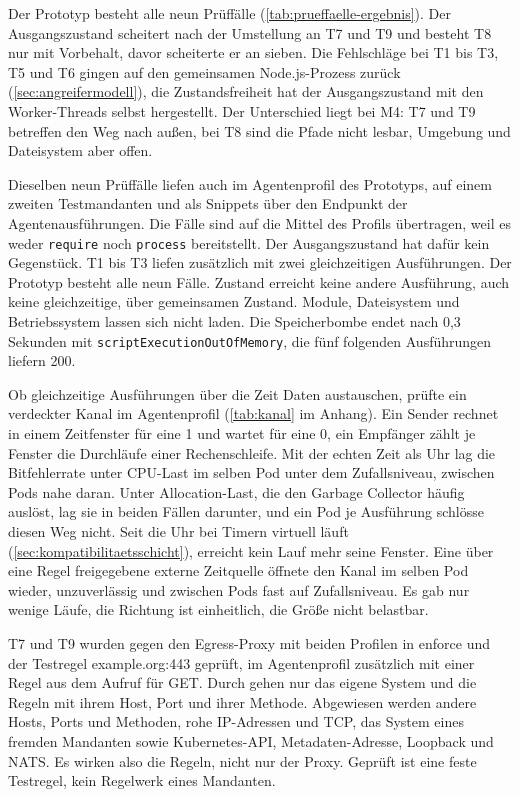 Der Prototyp besteht alle neun Prüffälle (\autoref{tab:prueffaelle-ergebnis}). Der Ausgangszustand scheitert nach der
Umstellung an T7 und T9 und besteht T8 nur mit Vorbehalt, davor scheiterte er an sieben. Die Fehlschläge bei T1 bis T3,
T5 und T6 gingen auf den gemeinsamen Node.js-Prozess zurück (\autoref{sec:angreifermodell}), die Zustandsfreiheit hat
der Ausgangszustand mit den Worker-Threads selbst hergestellt. Der Unterschied liegt bei M4: T7 und T9 betreffen den Weg
nach außen, bei T8 sind die Pfade nicht lesbar, Umgebung und Dateisystem aber offen.

Dieselben neun Prüffälle liefen auch im Agentenprofil des Prototyps, auf einem zweiten Testmandanten
und als Snippets über den Endpunkt der Agentenausführungen. Die Fälle sind auf die Mittel des
Profils übertragen, weil es weder \texttt{require} noch \texttt{process} bereitstellt. Der Ausgangszustand hat dafür kein Gegenstück. T1 bis T3 liefen
zusätzlich mit zwei gleichzeitigen Ausführungen. Der Prototyp besteht alle neun Fälle. Zustand erreicht keine andere Ausführung, auch
keine gleichzeitige, über gemeinsamen Zustand. Module, Dateisystem und Betriebssystem lassen sich nicht laden. Die Speicherbombe endet nach 0,3 Sekunden mit
\texttt{scriptExecutionOutOfMemory}, die fünf folgenden Ausführungen liefern 200.

Ob gleichzeitige Ausführungen über die Zeit Daten austauschen, prüfte ein verdeckter Kanal im Agentenprofil
(\autoref{tab:kanal} im Anhang). Ein Sender rechnet in einem Zeitfenster für eine 1 und wartet für eine 0, ein
Empfänger zählt je Fenster die Durchläufe einer Rechenschleife. Mit der echten Zeit als Uhr lag die Bitfehlerrate unter
\ac{CPU}-Last im selben Pod unter dem Zufallsniveau, zwischen Pods nahe daran. Unter Allocation-Last, die den Garbage
Collector häufig auslöst, lag sie in beiden Fällen darunter, und ein Pod je Ausführung schlösse diesen Weg nicht. Seit die
Uhr bei Timern virtuell läuft (\autoref{sec:kompatibilitaetsschicht}), erreicht kein Lauf mehr seine Fenster. Eine
über eine Regel freigegebene externe Zeitquelle öffnete den Kanal im selben Pod wieder, unzuverlässig und zwischen Pods
fast auf Zufallsniveau. Es gab nur wenige Läufe, die Richtung ist einheitlich, die Größe nicht belastbar.

T7 und T9 wurden gegen den Egress-Proxy mit beiden Profilen in enforce und der Testregel example.org:443 geprüft, im
Agentenprofil zusätzlich mit einer Regel aus dem Aufruf für GET. Durch gehen nur das eigene System und die Regeln mit
ihrem Host, Port und ihrer Methode. Abgewiesen werden andere Hosts, Ports und Methoden, rohe \ac{IP}-Adressen und \ac{TCP}, das
System eines fremden Mandanten sowie Kubernetes-\acs{API}, Metadaten-Adresse, Loopback und NATS. Es wirken also die
Regeln, nicht nur der Proxy. Geprüft ist eine feste Testregel, kein Regelwerk eines Mandanten.

